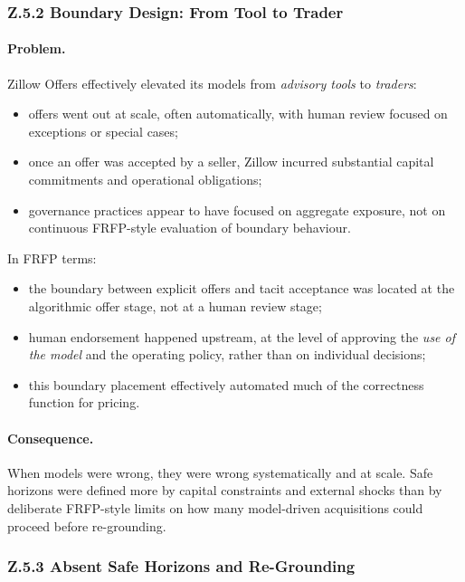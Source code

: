 \subsubsection*{Z.5.2 Boundary Design: From Tool to Trader}

\paragraph{Problem.}
Zillow Offers effectively elevated its models from \emph{advisory tools}
to \emph{traders}:

\begin{itemize}
  \item offers went out at scale, often automatically, with human review
        focused on exceptions or special cases;
  \item once an offer was accepted by a seller, Zillow incurred substantial
        capital commitments and operational obligations;
  \item governance practices appear to have focused on aggregate exposure,
        not on continuous FRFP-style evaluation of boundary behaviour.
\end{itemize}

In FRFP terms:

\begin{itemize}
  \item the boundary between explicit offers and tacit acceptance was
        located at the algorithmic offer stage, not at a human review stage;
  \item human endorsement happened upstream, at the level of approving the
        \emph{use of the model} and the operating policy, rather than on
        individual decisions;
  \item this boundary placement effectively automated much of the correctness
        function for pricing.
\end{itemize}

\paragraph{Consequence.}
When models were wrong, they were wrong systematically and at scale.
Safe horizons were defined more by capital constraints and external shocks
than by deliberate FRFP-style limits on how many model-driven acquisitions
could proceed before re-grounding.

\subsubsection*{Z.5.3 Absent Safe Horizons and Re-Grounding}

